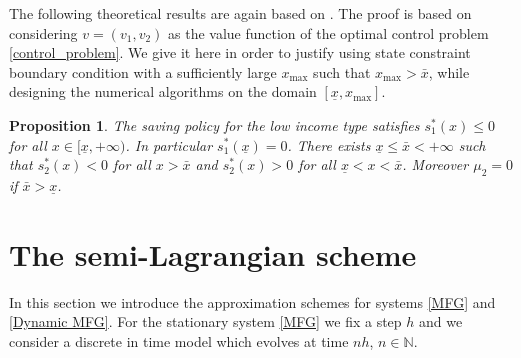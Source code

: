 \documentclass[11pt]{article}
\numberwithin{equation}{section}
\newtheorem{proposition}[theorem]{Proposition}
\theoremstyle{Claim}
\newcommand{\N}{\mathbb{N}}
\newcommand{\ux}{{\underline x}}
\theoremstyle{plain}
\begin{document}
The following theoretical results are again based on \cite[Proposition 1 and 2]{achdou2022income}. The proof is based on considering $v=(v_1,v_2)$ as the value function of the optimal control problem \eqref{control_problem}. We give it here in order to justify using state constraint boundary condition with a sufficiently large $x_{\max}$ such that $x_{\max}>\bar{x}$, while designing the numerical algorithms on the domain $[\ux,x_{\max}]$.   
\begin{proposition}
The saving policy for the low income type satisfies $s^*_1(x)\leq 0$ for all $x\in [\ux,+\infty)$. In particular $s^*_1(\ux)=0$. There exists $\ux\leq \bar{x}<+\infty$ such that 
$s_2^*(x)<0$ for all $x>\bar{x}$ and 
$s_2^*(x)>0$ for all $\ux<x<\bar{x}$.
Moreover $\mu_2=0$ if $\bar{x}>\ux$. 
\end{proposition}


\section{The  semi-Lagrangian scheme}
In this section we introduce the approximation schemes for systems \eqref{MFG} and \eqref{Dynamic MFG}. For the stationary system \eqref{MFG} we fix a step $h$ and we consider a discrete in time model which evolves at time $nh$, $n\in\N$.
\end{document}
